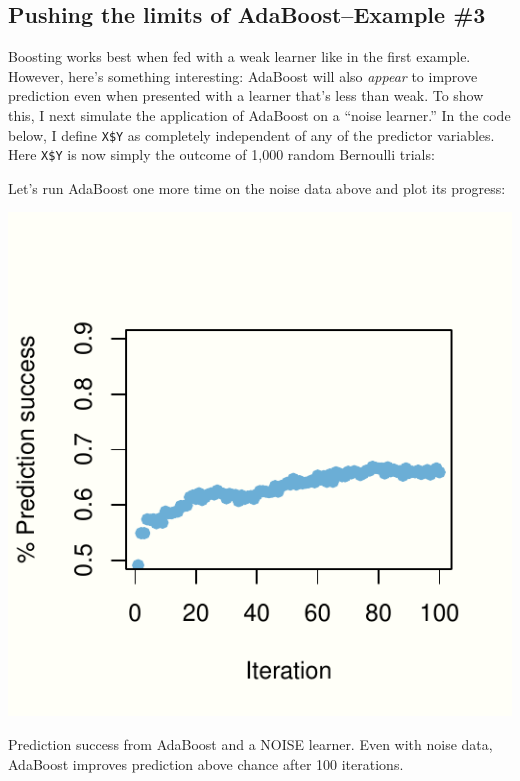 \documentclass[]{tufte-handout}
\newenvironment{Shaded}{}{}
\newcommand{\KeywordTok}[1]{\textcolor[rgb]{0.00,0.44,0.13}{\textbf{#1}}}
\newcommand{\DecValTok}[1]{\textcolor[rgb]{0.25,0.63,0.44}{#1}}
\newcommand{\StringTok}[1]{\textcolor[rgb]{0.25,0.44,0.63}{#1}}
\newcommand{\CommentTok}[1]{\textcolor[rgb]{0.38,0.63,0.69}{\textit{#1}}}
\newcommand{\OperatorTok}[1]{\textcolor[rgb]{0.40,0.40,0.40}{#1}}
\newcommand{\NormalTok}[1]{#1}
\begin{document}
\subsection{Pushing the limits of AdaBoost--Example
\#3}\label{pushing-the-limits-of-adaboostexample-3}

Boosting works best when fed with a weak learner like in the first
example. However, here's something interesting: AdaBoost will also
\emph{appear} to improve prediction even when presented with a learner
that's less than weak. To show this, I next simulate the application of
AdaBoost on a ``noise learner.'' In the code below, I define
\texttt{X\$Y} as completely independent of any of the predictor
variables. Here \texttt{X\$Y} is now simply the outcome of 1,000 random
Bernoulli trials:

\begin{Shaded}
\end{Shaded}

Let's run AdaBoost one more time on the noise data above and plot its
progress:

\begin{marginfigure}
\includegraphics{2018-02-19-data-science-unplugged-additive-boosting_files/figure-latex/boost.plot.noise-1} \caption[Prediction success from AdaBoost and a NOISE learner]{Prediction success from AdaBoost and a NOISE learner. Even with noise data, AdaBoost improves prediction above chance after 100 iterations.}\label{fig:boost.plot.noise}
\end{marginfigure}
\end{document}
